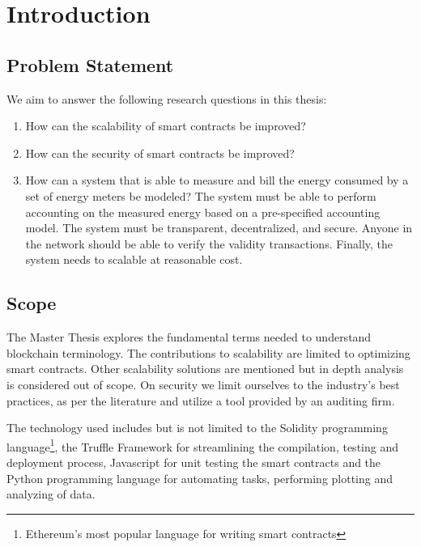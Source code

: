 \chapter{Introduction}

\section{Problem Statement}
We aim to answer the following research questions in this thesis:

\begin{enumerate}\label{statement}
    \item How can the scalability of smart contracts be improved?
    \item How can the security of smart contracts be improved?
    \item How can a system that is able to measure and bill the energy consumed by a set of energy meters be modeled? The system must be able to perform accounting on the measured energy based on a pre-specified accounting model. The system must be transparent, decentralized, and secure. Anyone in the network should be able to verify the validity transactions. Finally, the system needs to scalable at reasonable cost.
\end{enumerate}

\section{Scope}
The Master Thesis explores the fundamental terms needed to understand blockchain terminology. The contributions to scalability are limited to optimizing smart contracts. Other scalability solutions are mentioned but in depth analysis is considered out of scope. On security we limit ourselves to the industry's best practices, as per the literature and utilize a tool provided by an auditing firm.

The technology used includes but is not limited to the Solidity programming language\footnote{Ethereum's most popular language for writing smart contracts}, the Truffle Framework for streamlining the compilation, testing and deployment process, Javascript for unit testing the smart contracts and the Python programming language for automating tasks, performing plotting and analyzing of data.

